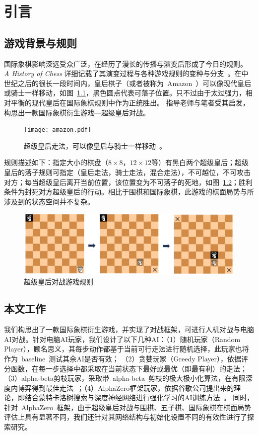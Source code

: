 \chapter{引言}
\label{chap:introduction}

\section{游戏背景与规则}
国际象棋影响深远受众广泛，在经历了漫长的传播与演变后形成了今日的规则。
\textit{A History of Chess} 详细记载了其演变过程与各种游戏规则的变种与分支~\cite{murray2015history}。在中世纪之后的很长一段时间内，皇后棋子（或者被称为~Amazon~）可以像现代皇后或骑士一样移动，如图~\ref{fig:superQueen}，黑色圆点代表可落子位置。只不过由于太过强力，相对平衡的现代皇后在国际象棋规则中作为正统胜出。
指导老师与笔者受其启发，构思出一款国际象棋衍生游戏—超级皇后对战。
\begin{figure}[htb]
  \centering
  \texttt{[image: amazon.pdf]}
  \caption[superQueen]{%
    超级皇后走法，可以像皇后与骑士一样移动~\cite{wikiAmazon}。}
  \label{fig:superQueen}
\end{figure}
规则描述如下：指定大小的棋盘（$8\times8$，$12\times12$等）有黑白两个超级皇后；超级皇后的落子规则可指定（皇后走法，骑士走法，混合走法），不可越位，不可攻击对方；每当超级皇后离开当前位置，该位置变为不可落子的死地，如图~\ref{fig:superQueenRules}；胜利条件为封死对方超级皇后的行动。相比于围棋和国际象棋，此游戏的棋面局势与所涉及到的状态空间并不复杂。

\begin{figure}[htb]
    \centering
    \includegraphics[width=1\textwidth]{rules.PNG}
    \caption[superQueenRules]{%
      超级皇后对战游戏规则%
      }
    \label{fig:superQueenRules}
  \end{figure}


\section{本文工作}
我们构思出了一款国际象棋衍生游戏，并实现了对战框架，可进行人机对战与电脑AI对战。针对电脑AI玩家，我们设计了以下几种AI：（1）随机玩家（Random Player），顾名思义，其每步动作都基于当前可行走法进行随机选择，此玩家也将作为~baseline~测试其余AI是否有效；
（2）贪婪玩家（Greedy Player），依据评分函数，在每一步选择中都采取在当前状态下最好或最优（即最有利）的走法；（3）alpha-beta剪枝玩家，采取带~alpha-beta~剪枝的极大极小化算法，在有限深度内博弈得到最佳走法~\cite{russell2010artificial}；（4）AlphaZero框架玩家，依据谷歌公司提出来的理论，即结合蒙特卡洛树搜索与深度神经网络进行强化学习的AI训练方法~\cite{Silver1140}。
同时，针对~AlphaZero~框架，由于超级皇后对战与围棋、五子棋、国际象棋在棋面局势评估上具有显著不同，我们还针对其网络结构与初始化设置不同的有效性进行了探索研究。

